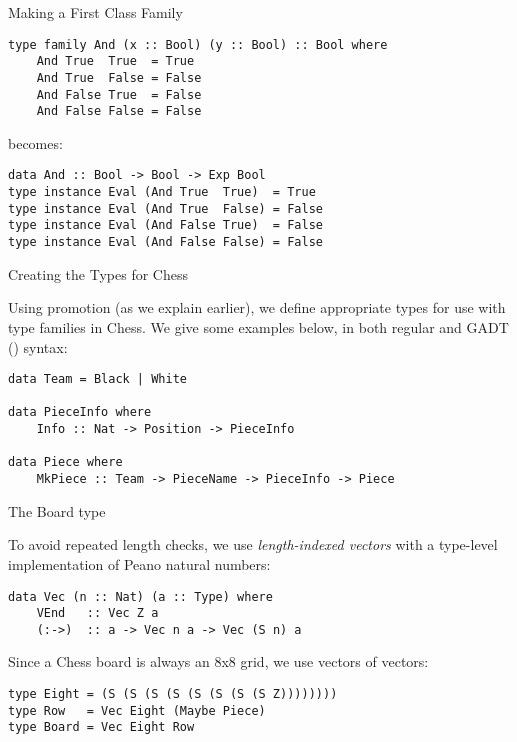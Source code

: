 \documentclass{beamer}
\begin{document}
\begin{frame}[fragile]{Making a First Class Family}

\begin{lstlisting}
type family And (x :: Bool) (y :: Bool) :: Bool where
    And True  True  = True
    And True  False = False
    And False True  = False
    And False False = False
\end{lstlisting}

\pause

becomes:

\begin{lstlisting}
data And :: Bool -> Bool -> Exp Bool
type instance Eval (And True  True)  = True
type instance Eval (And True  False) = False
type instance Eval (And False True)  = False
type instance Eval (And False False) = False
\end{lstlisting}

\end{frame}

\begin{frame}[fragile]{Creating the Types for Chess}

Using promotion (as we explain earlier), we define appropriate types for use with type families in Chess. We give some examples below, in both regular and GADT (\cite{gadts}) syntax:

\begin{lstlisting}
data Team = Black | White

data PieceInfo where
    Info :: Nat -> Position -> PieceInfo

data Piece where
    MkPiece :: Team -> PieceName -> PieceInfo -> Piece
\end{lstlisting}

\end{frame}

\begin{frame}[fragile]{The Board type}

To avoid repeated length checks, we use \emph{length-indexed vectors} with a type-level implementation of Peano natural numbers:

\begin{lstlisting}
data Vec (n :: Nat) (a :: Type) where
    VEnd   :: Vec Z a
    (:->)  :: a -> Vec n a -> Vec (S n) a
\end{lstlisting}

\pause

Since a Chess board is always an 8x8 grid, we use vectors of vectors:

\begin{lstlisting}
type Eight = (S (S (S (S (S (S (S (S Z))))))))
type Row   = Vec Eight (Maybe Piece)
type Board = Vec Eight Row
\end{lstlisting}

\end{frame}
\end{document}
